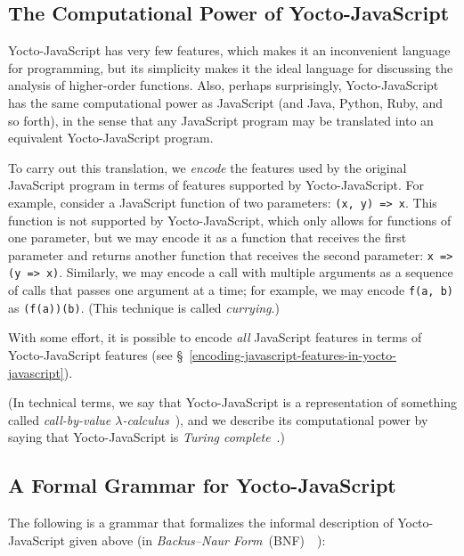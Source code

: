\documentclass[12pt, oneside]{book}
\begin{document}
\subsection{The Computational Power of Yocto-JavaScript}

Yocto-JavaScript has very few features, which makes it an inconvenient language for programming, but its simplicity makes it the ideal language for discussing the analysis of higher-order functions. Also, perhaps surprisingly, Yocto-JavaScript has the same computational power as JavaScript (and Java, Python, Ruby, and so forth), in the sense that any JavaScript program may be translated into an equivalent Yocto-JavaScript program.

To carry out this translation, we \emph{encode} the features used by the original JavaScript program in terms of features supported by Yocto-JavaScript. For example, consider a JavaScript function of two parameters: \texttt{(x, y) => x}. This function is not supported by Yocto-JavaScript, which only allows for functions of one parameter, but we may encode it as a function that receives the first parameter and returns another function that receives the second parameter: \texttt{x => (y => x)}. Similarly, we may encode a call with multiple arguments as a sequence of calls that passes one argument at a time; for example, we may encode \texttt{f(a, b)} as \texttt{(f(a))(b)}. (This technique is called \emph{currying}.)

With some effort, it is possible to encode \emph{all} JavaScript features in terms of Yocto-JavaScript features (see §~\ref{encoding-javascript-features-in-yocto-javascript}).

(In technical terms, we say that Yocto-JavaScript is a representation of something called \emph{call-by-value $\lambda$-calculus}~\cite[§~6]{understanding-computation}), and we describe its computational power by saying that Yocto-JavaScript is \emph{Turing complete}~\cite[§~7]{understanding-computation}.)

\subsection{A Formal Grammar for Yocto-JavaScript}
\label{a-formal-grammar-for-yocto-javascript}

The following is a grammar that formalizes the informal description of Yocto-JavaScript given above (in \emph{Backus–Naur Form}~(BNF)~\cite{bnf}~\cite[§~4.2]{dragon-book}):
\end{document}

